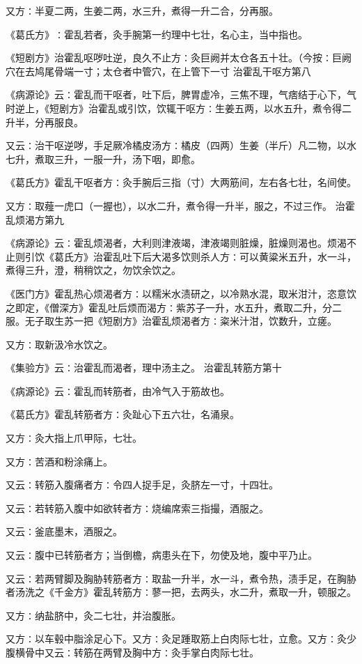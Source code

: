 \documentclass[a4paper,12pt,UTF8,twoside]{ctexbook}
\begin{document}
又方∶半夏二两，生姜二两，水三升，煮得一升二合，分再服。

《葛氏方》∶霍乱若者，灸手腕第一约理中七壮，名心主，当中指也。

《短剧方》治霍乱呕哕吐逆，良久不止方∶灸巨阙并太仓各五十壮。（今按∶巨阙穴在去鸠尾骨端一寸；太仓者中管穴，在上管下一寸
治霍乱干呕方第八

《病源论》云∶霍乱而干呕者，吐下后，脾胃虚冷，三焦不理，气痞结于心下，气时逆上，《短剧方》治霍乱或引饮，饮辄干呕方∶生姜五两，以水五升，煮令得二升半，分再服良。

又云∶治干呕逆哕，手足厥冷橘皮汤方∶橘皮（四两）生姜（半斤）凡二物，以水七升，煮取三升，一服一升，汤下咽，即愈。

《葛氏方》霍乱干呕者方∶灸手腕后三指（寸）大两筋间，左右各七壮，名间使。

又方∶取薤一虎口（一握也），以水二升，煮令得一升半，服之，不过三作。
治霍乱烦渴方第九

《病源论》云∶霍乱烦渴者，大利则津液竭，津液竭则脏燥，脏燥则渴也。烦渴不止则引饮《葛氏方》治霍乱吐下后大渴多饮则杀人方∶可以黄粱米五升，水一斗，煮得三升，澄，稍稍饮之，勿饮余饮之。

《医门方》霍乱热心烦渴者方∶以糯米水渍研之，以冷熟水混，取米泔汁，恣意饮之即定，《僧深方》霍乱吐后烦而渴方∶紫苏子一升，水五升，煮取二升，分二服。无子取生苏一把《短剧方》治霍乱烦渴者方∶粢米汁泔，饮数升，立瘥。

又方∶取新汲冷水饮之。

《集验方》云∶治霍乱而渴者，理中汤主之。
治霍乱转筋方第十

《病源论》云∶霍乱而转筋者，由冷气入于筋故也。

《葛氏方》霍乱转筋者方∶灸趾心下五六壮，名涌泉。

又方∶灸大指上爪甲际，七壮。

又方∶苦酒和粉涂痛上。

又云∶转筋入腹痛者方∶令四人捉手足，灸脐左一寸，十四壮。

又云∶若转筋入腹中如欲转者方∶烧编席索三指撮，酒服之。

又云∶釜底墨末，酒服之。

又云∶腹中已转筋者方；当倒檐，病患头在下，勿使及地，腹中平乃止。

又云∶若两臂脚及胸胁转筋者方∶取盐一升半，水一斗，煮令热，渍手足，在胸胁者汤洗之《千金方》霍乱转筋方∶蓼一把，去两头，水二升，煮取一升，顿服之。

又方∶纳盐脐中，灸二七壮，并治腹胀。

又方∶以车毂中脂涂足心下。又方∶灸足踵取筋上白肉际七壮，立愈。又方∶灸少腹横骨中又云∶转筋在两臂及胸中方∶灸手掌白肉际七壮。
\end{document}
